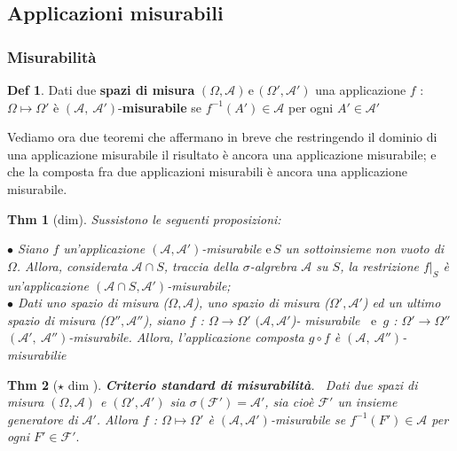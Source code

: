 \documentclass[a4paper,11pt]{article}
\theoremstyle{plain}
\newtheorem{thm}{Thm}[section]
\theoremstyle{definition}
\newtheorem{defn}{Def}[section]
\theoremstyle{remark}
\begin{document}
\subsection{Applicazioni misurabili}
\subsubsection{Misurabilità}
\begin{defn}
Dati due \textbf{spazi di misura} $(\Omega, \mathcal{A}) \, \mathrm{e} \, (\Omega', \mathcal{A'})$ una applicazione $f$ : $\Omega\mapsto\Omega'$ è $(\mathcal{A},\ \mathcal{A}')$-\textbf{misurabile} se $f^{-1}(A')\in \mathcal{A}$ per ogni $A'\in \mathcal{A}'$
\end{defn}

Vediamo ora due teoremi che affermano in breve che restringendo il dominio di una applicazione misurabile il risultato è ancora una applicazione misurabile; e che la composta fra due applicazioni misurabili è ancora una applicazione misurabile.

\begin{thm}[dim]
Sussistono le seguenti proposizioni:

$\bullet$ Siano $f$ un'applicazione $(\mathcal{A},\mathcal{A}')$-misurabile $\mathrm{e}\, S$ un sottoinsieme non vuoto di $\Omega$. Allora, considerata $\mathcal{A}\cap S$, traccia della $\sigma$-algrebra $\mathcal{A}$ su $S$, la restrizione $f|_{S}$ è un'applicazione $(\mathcal{A}\cap S, \mathcal{A}')$-misurabile;\\

$\bullet$ Dati uno spazio di misura ($\Omega, \mathcal{A}$), uno spazio di misura ($\Omega', \mathcal{A'}$) ed un ultimo spazio di misura ($\Omega'', \mathcal{A}''$), siano $f$ : $\Omega\rightarrow\Omega'$ $(\mathcal{A}, \mathcal{A'}$)- misurabile \, $\mathrm{e}$\, $g$ : $\Omega'\rightarrow\Omega''$ $(\mathcal{A}',\ \mathcal{A}'')$-misurabile. Allora, l'applicazione composta $g \circ f$ è $(\mathcal{A},\ \mathcal{A}'')$-misurabilie
\end{thm}

\begin{thm} [$\star$ dim ] \textbf{Criterio standard di misurabilità}. \, Dati due spazi di misura $(\Omega,\mathcal{A})$ e $(\Omega',\mathcal{A}')$
sia $\sigma(\mathcal{F}')=\mathcal{A}'$, sia cioè $\mathcal{F}'$ un insieme generatore di $\mathcal{A'}$. Allora $f$ : $\Omega\mapsto\Omega'$ è $(\mathcal{A}, \mathcal{A}')$-misurabile se $f^{-1}(F')\in \mathcal{A}$ per ogni $F'\in \mathcal{F}'.$ 
\end{thm}
\end{document}
